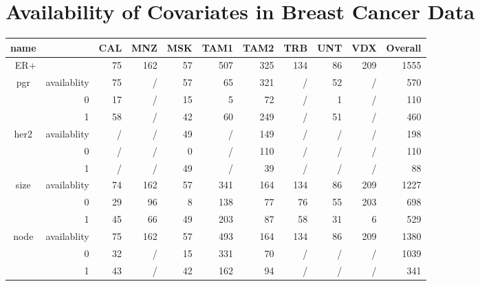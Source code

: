\documentclass{article}
\begin{document}
\section{Availability of Covariates in Breast Cancer Data}
\begin{table}[H]
  \centering
    \begin{tabular}{rrrrrrrrrrr}
    \toprule
    name  &       & \multicolumn{1}{l}{CAL} & \multicolumn{1}{l}{MNZ} & \multicolumn{1}{l}{MSK} & \multicolumn{1}{l}{TAM1} & \multicolumn{1}{l}{TAM2} & \multicolumn{1}{l}{TRB} & \multicolumn{1}{l}{UNT} & \multicolumn{1}{l}{VDX} & \multicolumn{1}{l}{Overall} \\
    \midrule
    ER+   &       & 75    & 162   & 57    & 507   & 325   & 134   & 86    & 209   & 1555 \\
    \multicolumn{1}{c}{\multirow{3}[0]{*}{pgr  }} & availablity & 75    & /     & 57    & 65    & 321   & /     & 52    & /     & 570 \\
    \multicolumn{1}{c}{} & 0     & 17    & /     & 15    & 5     & 72    & /     & 1     & /     & 110 \\
    \multicolumn{1}{c}{} & 1     & 58    & /     & 42    & 60    & 249   & /     & 51    & /     & 460 \\
    \multicolumn{1}{c}{\multirow{3}[0]{*}{her2  }} & availablity & /     & /     & 49    & /     & 149   & /     & /     & /     & 198 \\
    \multicolumn{1}{c}{} & 0     & /     & /     & 0     & /     & 110   & /     & /     & /     & 110 \\
    \multicolumn{1}{c}{} & 1     & /     & /     & 49    & /     & 39    & /     & /     & /     & 88 \\
    \multicolumn{1}{c}{\multirow{3}[0]{*}{size}} & availablity & 74    & 162   & 57    & 341   & 164   & 134   & 86    & 209   & 1227 \\
    \multicolumn{1}{c}{} & 0     & 29    & 96    & 8     & 138   & 77    & 76    & 55    & 203   & 698 \\
    \multicolumn{1}{c}{} & 1     & 45    & 66    & 49    & 203   & 87    & 58    & 31    & 6     & 529 \\
    \multicolumn{1}{c}{\multirow{3}[0]{*}{node }} & availablity & 75    & 162   & 57    & 493   & 164   & 134   & 86    & 209   & 1380 \\
    \multicolumn{1}{c}{} & 0     & 32    & /   & 15    & 331   & 70    & /   & /    & /   & 1039 \\
    \multicolumn{1}{c}{} & 1     & 43    & /     & 42    & 162   & 94    & /     & /     & /     & 341 \\

\end{tabular}
\end{table}
\end{document}
